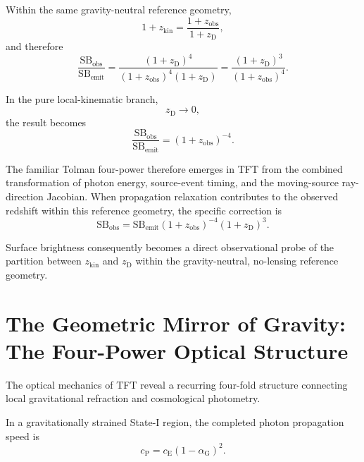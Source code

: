 Within the same gravity-neutral reference geometry,
\begin{equation}
    1+z_{\mathrm{kin}}
    =
    \frac{1+z_{\mathrm{obs}}}
    {1+z_{\mathrm D}},
\end{equation}
and therefore
\begin{equation}
    \frac{\mathrm{SB}_{\mathrm{obs}}}
    {\mathrm{SB}_{\mathrm{emit}}}
    =
    \frac{(1+z_{\mathrm D})^4}
    {(1+z_{\mathrm{obs}})^4(1+z_{\mathrm D})}
    =
    \frac{(1+z_{\mathrm D})^3}
    {(1+z_{\mathrm{obs}})^4}.
\end{equation}

In the pure local-kinematic branch,
\begin{equation}
    z_{\mathrm D}
    \rightarrow
    0,
\end{equation}
the result becomes
\begin{equation}
    \frac{\mathrm{SB}_{\mathrm{obs}}}
    {\mathrm{SB}_{\mathrm{emit}}}
    =
    (1+z_{\mathrm{obs}})^{-4}.
\end{equation}

The familiar Tolman four-power therefore emerges in TFT from the combined transformation of photon energy, source-event timing, and the moving-source ray-direction Jacobian. When propagation relaxation contributes to the observed redshift within this reference geometry, the specific correction is
\begin{equation}
    \mathrm{SB}_{\mathrm{obs}}
    =
    \mathrm{SB}_{\mathrm{emit}}
    (1+z_{\mathrm{obs}})^{-4}
    (1+z_{\mathrm D})^3.
\end{equation}

Surface brightness consequently becomes a direct observational probe of the partition between $z_{\mathrm{kin}}$ and $z_{\mathrm D}$ within the gravity-neutral, no-lensing reference geometry.


\section{The Geometric Mirror of Gravity: The Four-Power Optical Structure}

The optical mechanics of TFT reveal a recurring four-fold structure connecting local gravitational refraction and cosmological photometry.

In a gravitationally strained State-I region, the completed photon propagation speed is
\begin{equation}
    c_{\mathrm P}
    =
    c_{\mathrm E}(1-\alpha_{\mathrm G})^2.
\end{equation}

